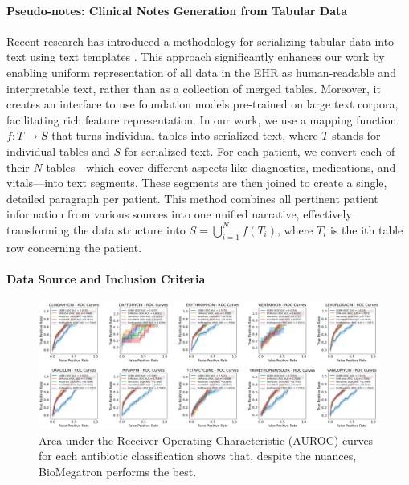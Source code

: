 \documentclass{article}
\theoremstyle{plain}
\theoremstyle{definition}
\theoremstyle{remark}
\begin{document}
\paragraph{Pseudo-notes: Clinical Notes Generation from Tabular Data} Recent research has introduced a methodology for serializing tabular data into text using text templates \cite{hegselmann2023tabllm}. This approach significantly enhances our work by enabling uniform representation of all data in the EHR as human-readable and interpretable text, rather than as a collection of merged tables. Moreover, it creates an interface to use foundation models pre-trained on large text corpora, facilitating rich feature representation. In our work, we use a mapping function \( f: T \rightarrow S \) that turns individual tables into serialized text, where \( T \) stands for individual tables and \( S \) for serialized text. For each patient, we convert each of their $N$ tables—which cover different aspects like diagnostics, medications, and vitals—into text segments. These segments are then joined to create a single, detailed paragraph per patient. This method combines all pertinent patient information from various sources into one unified narrative, effectively transforming the data structure into \( S = \bigcup_{i=1}^{N} f(T_i) \), where \( T_i \) is the ith table row concerning the patient.

\paragraph{Data Source and Inclusion Criteria}

\begin{figure}[t!]
\vskip -0.1in
\begin{center}
\centerline{\includegraphics[width=6.5in]{auroc.png}}
\caption{Area under the Receiver Operating Characteristic (AUROC) curves for each antibiotic classification shows that, despite the nuances, BioMegatron performs the best.}
\label{auroc}
\end{center}
\vskip -0.1in
\end{figure}
\end{document}
